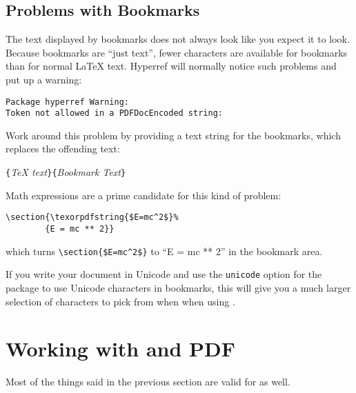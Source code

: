 \subsection{Problems with Bookmarks}

The text displayed by bookmarks does not always look like you expect
it to look. Because bookmarks are \enquote{just text}, fewer
characters are available for bookmarks than for normal \LaTeX{} text.
Hyperref will normally notice such problems and put up a warning:
\begin{code}
\begin{verbatim}
Package hyperref Warning:
Token not allowed in a PDFDocEncoded string:
\end{verbatim}
\end{code}
Work around this problem by providing a text string for
the bookmarks, which replaces the offending text:
\begin{lscommand}
  \verb|{|\emph{\TeX{} text}\verb|}{|\emph{Bookmark Text}\verb|}|
\end{lscommand}

Math expressions are a prime candidate for this kind of problem:
\begin{code}
\begin{verbatim}
\section{\texorpdfstring{$E=mc^2$}%
        {E = mc ** 2}}
\end{verbatim}
\end{code}
which turns \verb+\section{$E=mc^2$}+ to ``E = mc ** 2'' in the bookmark area.

If you write your document in Unicode and use the \verb+unicode+ option for
the  package to use Unicode characters in bookmarks, this
will give you a much larger selection of characters to pick from when
when using .

\section{Working with  and PDF}%
\label{sec:xetex}

%
Most of the things said in the previous section are valid for  as well.

